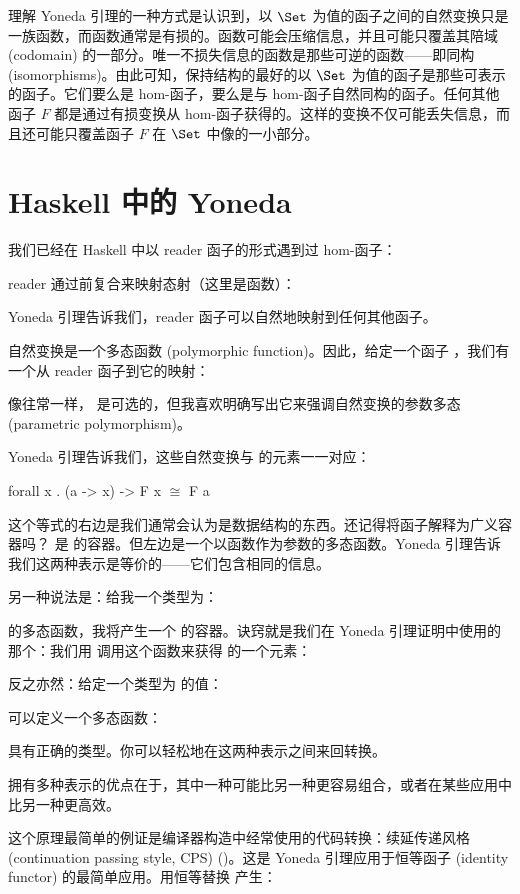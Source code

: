 理解 Yoneda 引理的一种方式是认识到，以 $\Set$ 为值的函子之间的自然变换只是一族函数，而函数通常是有损的。函数可能会压缩信息，并且可能只覆盖其陪域 (codomain) 的一部分。唯一不损失信息的函数是那些可逆的函数——即同构 (isomorphisms)。由此可知，保持结构的最好的以 $\Set$ 为值的函子是那些可表示的函子。它们要么是 hom-函子，要么是与 hom-函子自然同构的函子。任何其他函子 $F$ 都是通过有损变换从 hom-函子获得的。这样的变换不仅可能丢失信息，而且还可能只覆盖函子 $F$ 在 $\Set$ 中像的一小部分。

\section{Haskell 中的 Yoneda}

我们已经在 Haskell 中以 reader 函子的形式遇到过 hom-函子：

reader 通过前复合来映射态射（这里是函数）：

Yoneda 引理告诉我们，reader 函子可以自然地映射到任何其他函子。

自然变换是一个多态函数 (polymorphic function)。因此，给定一个函子 ，我们有一个从 reader 函子到它的映射：

像往常一样， 是可选的，但我喜欢明确写出它来强调自然变换的参数多态 (parametric polymorphism)。

Yoneda 引理告诉我们，这些自然变换与  的元素一一对应：

\begin{snipv}
forall x . (a -> x) -> F x \ensuremath{\cong} F a
\end{snipv}
这个等式的右边是我们通常会认为是数据结构的东西。还记得将函子解释为广义容器吗？ 是  的容器。但左边是一个以函数作为参数的多态函数。Yoneda 引理告诉我们这两种表示是等价的——它们包含相同的信息。

另一种说法是：给我一个类型为：

的多态函数，我将产生一个  的容器。诀窍就是我们在 Yoneda 引理证明中使用的那个：我们用  调用这个函数来获得  的一个元素：

反之亦然：给定一个类型为  的值：

可以定义一个多态函数：

具有正确的类型。你可以轻松地在这两种表示之间来回转换。

拥有多种表示的优点在于，其中一种可能比另一种更容易组合，或者在某些应用中比另一种更高效。

这个原理最简单的例证是编译器构造中经常使用的代码转换：续延传递风格 (continuation passing style, CPS) ()。这是 Yoneda 引理应用于恒等函子 (identity functor) 的最简单应用。用恒等替换  产生：

